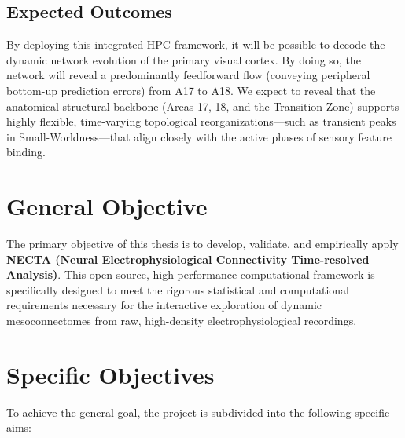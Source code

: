 \subsection{Expected Outcomes}
By deploying this integrated HPC framework, it will be possible to decode the dynamic network evolution of the primary visual cortex. By doing so, the network will reveal a predominantly feedforward flow (conveying peripheral bottom-up prediction errors) from A17 to A18. We expect to reveal that the anatomical structural backbone (Areas 17, 18, and the Transition Zone) supports highly flexible, time-varying topological reorganizations—such as transient peaks in Small-Worldness—that align closely with the active phases of sensory feature binding.

\section{General Objective}
The primary objective of this thesis is to develop, validate, and empirically apply \textbf{NECTA (Neural Electrophysiological Connectivity Time-resolved Analysis)}. This open-source, high-performance computational framework is specifically designed to meet the rigorous statistical and computational requirements necessary for the interactive exploration of dynamic mesoconnectomes from raw, high-density electrophysiological recordings.

\section{Specific Objectives}
To achieve the general goal, the project is subdivided into the following specific aims:

